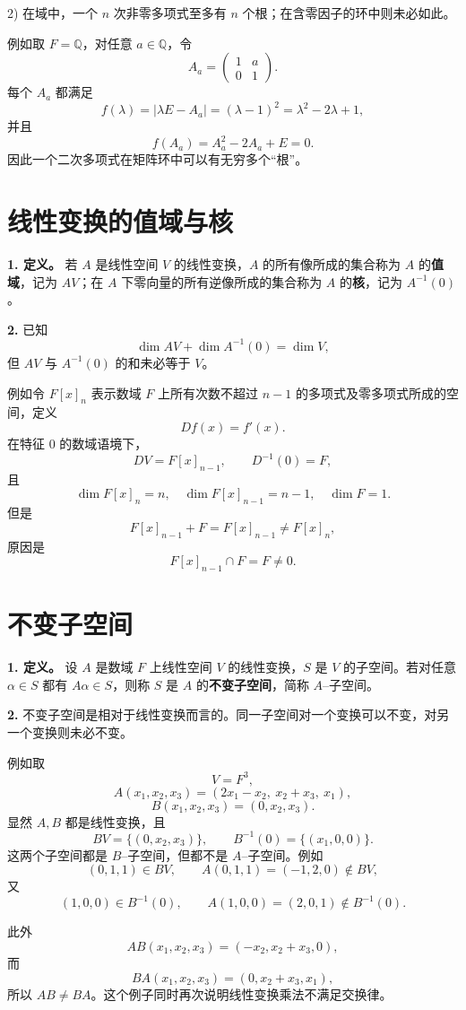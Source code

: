 2) 在域中，一个 $n$ 次非零多项式至多有 $n$ 个根；在含零因子的环中则未必如此。

例如取 $F=\mathbb Q$，对任意 $a\in\mathbb Q$，令
\[
A_a=\begin{pmatrix}1&a\\0&1\end{pmatrix}.
\]
每个 $A_a$ 都满足
\[
f(\lambda)=|\lambda E-A_a|=(\lambda-1)^2=\lambda^2-2\lambda+1,
\]
并且
\[
f(A_a)=A_a^2-2A_a+E=0.
\]
因此一个二次多项式在矩阵环中可以有无穷多个“根”。

\section{线性变换的值域与核}

\textbf{1. 定义。} 若 $A$ 是线性空间 $V$ 的线性变换，$A$ 的所有像所成的集合称为 $A$ 的\textbf{值域}，记为 $AV$；在 $A$ 下零向量的所有逆像所成的集合称为 $A$ 的\textbf{核}，记为 $A^{-1}(0)$。

\textbf{2.} 已知
\[
\dim AV+\dim A^{-1}(0)=\dim V,
\]
但 $AV$ 与 $A^{-1}(0)$ 的和未必等于 $V$。

例如令 $F[x]_n$ 表示数域 $F$ 上所有次数不超过 $n-1$ 的多项式及零多项式所成的空间，定义
\[
Df(x)=f'(x).
\]
在特征 $0$ 的数域语境下，
\[
DV=F[x]_{n-1},
\qquad
D^{-1}(0)=F,
\]
且
\[
\dim F[x]_n=n,
\quad
\dim F[x]_{n-1}=n-1,
\quad
\dim F=1.
\]
但是
\[
F[x]_{n-1}+F=F[x]_{n-1}\ne F[x]_n,
\]
原因是
\[
F[x]_{n-1}\cap F=F\ne0.
\]

\section{不变子空间}

\textbf{1. 定义。} 设 $A$ 是数域 $F$ 上线性空间 $V$ 的线性变换，$S$ 是 $V$ 的子空间。若对任意 $\alpha\in S$ 都有 $A\alpha\in S$，则称 $S$ 是 $A$ 的\textbf{不变子空间}，简称 $A$--子空间。

\textbf{2.} 不变子空间是相对于线性变换而言的。同一子空间对一个变换可以不变，对另一个变换则未必不变。

例如取
\[
V=F^3,
\]
\[
A(x_1,x_2,x_3)=(2x_1-x_2,\ x_2+x_3,\ x_1),
\]
\[
B(x_1,x_2,x_3)=(0,x_2,x_3).
\]
显然 $A,B$ 都是线性变换，且
\[
BV=\{(0,x_2,x_3)\},
\qquad
B^{-1}(0)=\{(x_1,0,0)\}.
\]
这两个子空间都是 $B$--子空间，但都不是 $A$--子空间。例如
\[
(0,1,1)\in BV,
\qquad
A(0,1,1)=(-1,2,0)\notin BV,
\]
又
\[
(1,0,0)\in B^{-1}(0),
\qquad
A(1,0,0)=(2,0,1)\notin B^{-1}(0).
\]

此外
\[
AB(x_1,x_2,x_3)=(-x_2,x_2+x_3,0),
\]
而
\[
BA(x_1,x_2,x_3)=(0,x_2+x_3,x_1),
\]
所以 $AB\ne BA$。这个例子同时再次说明线性变换乘法不满足交换律。

